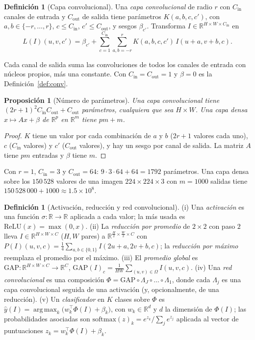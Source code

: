 \documentclass[11pt]{article}
\newtheorem{proposicion}[teorema]{Proposición}
\theoremstyle{definition}
\newtheorem{definicion}[teorema]{Definición}
\theoremstyle{remark}
\newcommand{\R}{\mathbb{R}}
\DeclareMathOperator*{\argmax}{arg\,max}
\begin{document}
\begin{definicion}[Capa convolucional]\label{def:capa-conv}
\noindent Una \emph{capa convolucional} de radio $r$ con $C_{\mathrm{in}}$ canales de entrada y $C_{\mathrm{out}}$ de salida tiene parámetros $K(a,b,c,c')$, con $a,b\in\{-r,\dots,r\}$, $c\le C_{\mathrm{in}}$, $c'\le C_{\mathrm{out}}$, y sesgos $\beta_{c'}$. Transforma $I\in\R^{H\times W\times C_{\mathrm{in}}}$ en
\[
L(I)(u,v,c')=\beta_{c'}+\sum_{c=1}^{C_{\mathrm{in}}}\sum_{a,b=-r}^{r}K(a,b,c,c')\,I(u+a,v+b,c).
\]
\end{definicion}

\noindent Cada canal de salida suma las convoluciones de todos los canales de entrada con núcleos propios, más una constante. Con $C_{\mathrm{in}}=C_{\mathrm{out}}=1$ y $\beta=0$ es la Definición~\ref{def:conv}.

\begin{proposicion}[Número de parámetros]\label{prop:param-conv}
\noindent Una capa convolucional tiene $(2r+1)^2C_{\mathrm{in}}C_{\mathrm{out}}+C_{\mathrm{out}}$ parámetros, cualquiera que sea $H\times W$. Una capa \emph{densa} $x\mapsto Ax+\beta$ de $\R^p$ en $\R^m$ tiene $pm+m$.
\end{proposicion}
\begin{proof}
\noindent $K$ tiene un valor por cada combinación de $a$ y $b$ ($2r+1$ valores cada uno), $c$ ($C_{\mathrm{in}}$ valores) y $c'$ ($C_{\mathrm{out}}$ valores), y hay un sesgo por canal de salida. La matriz $A$ tiene $pm$ entradas y $\beta$ tiene $m$.
\end{proof}

\noindent Con $r=1$, $C_{\mathrm{in}}=3$ y $C_{\mathrm{out}}=64$: $9\cdot3\cdot64+64=1792$ parámetros. Una capa densa sobre los $150\,528$ valores de una imagen $224\times224\times3$ con $m=1000$ salidas tiene $150\,528\,000+1000\approx1.5\times10^8$.

\begin{definicion}[Activación, reducción y red convolucional]\label{def:cnn}
\noindent (i) Una \emph{activación} es una función $\sigma:\R\to\R$ aplicada a cada valor; la más usada es $\mathrm{ReLU}(x)=\max(0,x)$. (ii) La \emph{reducción por promedio} de $2\times2$ con paso $2$ lleva $I\in\R^{H\times W\times C}$ ($H,W$ pares) a $\R^{\frac H2\times\frac W2\times C}$ con $P(I)(u,v,c)=\frac14\sum_{a,b\in\{0,1\}}I(2u+a,2v+b,c)$; la \emph{reducción por máximo} reemplaza el promedio por el máximo. (iii) El \emph{promedio global} es $\mathrm{GAP}:\R^{H\times W\times C}\to\R^C$, $\mathrm{GAP}(I)_c=\frac1{HW}\sum_{(u,v)\in\Omega}I(u,v,c)$. (iv) Una \emph{red convolucional} es una composición $\Phi=\mathrm{GAP}\circ\Lambda_J\circ\dots\circ\Lambda_1$, donde cada $\Lambda_j$ es una capa convolucional seguida de una activación (y, opcionalmente, de una reducción). (v) Un \emph{clasificador} en $K$ clases sobre $\Phi$ es $\hat y(I)=\argmax_k\big(w_k^\top\Phi(I)+\beta_k\big)$, con $w_k\in\R^{d}$ y $d$ la dimensión de $\Phi(I)$; las probabilidades asociadas son $\mathrm{softmax}(z)_k=e^{z_k}/\sum_je^{z_j}$ aplicada al vector de puntuaciones $z_k=w_k^\top\Phi(I)+\beta_k$.
\end{definicion}
\end{document}
